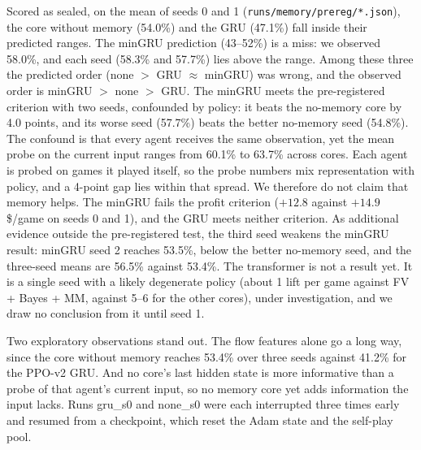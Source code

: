 \documentclass{article}
\newcommand{\file}[1]{{\small\texttt{#1}}}
\begin{document}
\begin{table}[h]
  \centering\scriptsize\setlength{\tabcolsep}{3pt}
  \caption{Memory agents after 2000 updates. Probe at the PPO-v2 table (3000 games, 5-fold CV), profit over 1000 games per matchup. Each cell is the mean over seeds, [min--max] over seeds, and ($\pm$ mean per-run 95\% CI). Seed 2 is additional and not part of the pre-registered test, which uses seeds 0 and 1. Transformer seed 1 is pending. The hand-only posterior gives 38.9\%. Files: \file{runs/memory/<core>\_s<seed>/\{probe,eval\}.json}, table by \file{scripts/memory\_report.py}.}
  \label{tab:memory}
  
\end{table}

Scored as sealed, on the mean of seeds 0 and 1 (\file{runs/memory/prereg/*.json}), the core without memory (54.0\%) and the GRU (47.1\%) fall inside their predicted ranges. The minGRU prediction (43--52\%) is a miss: we observed 58.0\%, and each seed (58.3\% and 57.7\%) lies above the range.
Among these three the predicted order (none $>$ GRU $\approx$ minGRU) was wrong, and the observed order is minGRU $>$ none $>$ GRU.
The minGRU meets the pre-registered criterion with two seeds, confounded by policy: it beats the no-memory core by 4.0 points, and its worse seed (57.7\%) beats the better no-memory seed (54.8\%).
The confound is that every agent receives the same observation, yet the mean probe on the current input ranges from 60.1\% to 63.7\% across cores. Each agent is probed on games it played itself, so the probe numbers mix representation with policy, and a 4-point gap lies within that spread.
We therefore do not claim that memory helps. The minGRU fails the profit criterion ($+12.8$ against $+14.9$ \$/game on seeds 0 and 1), and the GRU meets neither criterion.
As additional evidence outside the pre-registered test, the third seed weakens the minGRU result: minGRU seed 2 reaches 53.5\%, below the better no-memory seed, and the three-seed means are 56.5\% against 53.4\%.
The transformer is not a result yet. It is a single seed with a likely degenerate policy (about 1 lift per game against FV + Bayes + MM, against 5--6 for the other cores), under investigation, and we draw no conclusion from it until seed 1.

Two exploratory observations stand out. The flow features alone go a long way, since the core without memory reaches 53.4\% over three seeds against 41.2\% for the PPO-v2 GRU.
And no core's last hidden state is more informative than a probe of that agent's current input, so no memory core yet adds information the input lacks.
Runs gru\_s0 and none\_s0 were each interrupted three times early and resumed from a checkpoint, which reset the Adam state and the self-play pool.
\end{document}
